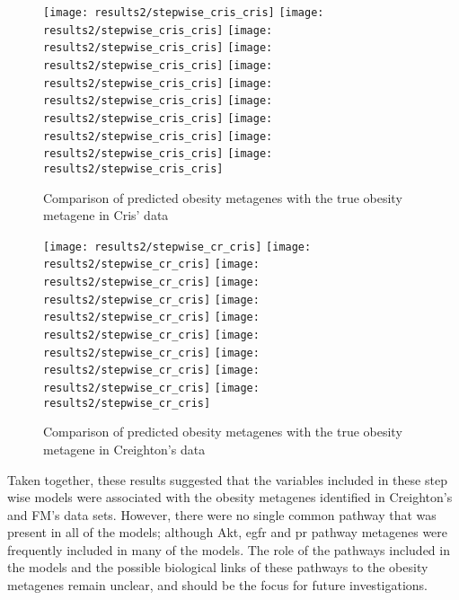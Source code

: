 \begin{figure}[htpb]
	\centering
	\texttt{[image: results2/stepwise\_cris\_cris]}
	\texttt{[image: results2/stepwise\_cris\_cris]}
	\texttt{[image: results2/stepwise\_cris\_cris]}
	\texttt{[image: results2/stepwise\_cris\_cris]}
	\texttt{[image: results2/stepwise\_cris\_cris]}
	\texttt{[image: results2/stepwise\_cris\_cris]}
	\texttt{[image: results2/stepwise\_cris\_cris]}
	\texttt{[image: results2/stepwise\_cris\_cris]}
	\texttt{[image: results2/stepwise\_cris\_cris]}
	\texttt{[image: results2/stepwise\_cris\_cris]}
	\caption{Comparison of predicted obesity metagenes with the true obesity metagene in Cris' data}
	\label{fig:stepwise_cris}
\end{figure}

\begin{figure}[htpb]
	\centering
	\texttt{[image: results2/stepwise\_cr\_cris]}
	\texttt{[image: results2/stepwise\_cr\_cris]}
	\texttt{[image: results2/stepwise\_cr\_cris]}
	\texttt{[image: results2/stepwise\_cr\_cris]}
	\texttt{[image: results2/stepwise\_cr\_cris]}
	\texttt{[image: results2/stepwise\_cr\_cris]}
	\texttt{[image: results2/stepwise\_cr\_cris]}
	\texttt{[image: results2/stepwise\_cr\_cris]}
	\texttt{[image: results2/stepwise\_cr\_cris]}
	\texttt{[image: results2/stepwise\_cr\_cris]}
	\caption{Comparison of predicted obesity metagenes with the true obesity metagene in Creighton's data}
	\label{fig:stepwise_cr}
\end{figure}

Taken together, these results suggested that the variables included in these step wise models were associated with the obesity metagenes identified in Creighton's and FM's data sets.
However, there were no single common pathway that was present in all of the models; although Akt, \gls{egfr} and \gls{pr} pathway metagenes were frequently included in many of the models.
The role of the pathways included in the models and the possible biological links of these pathways to the obesity metagenes remain unclear, and should be the focus for future investigations.



